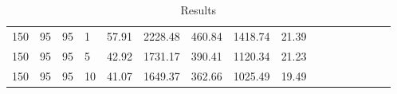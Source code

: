 \begin{center}
\begin{table}[h]
\begin{tabular}{clclclclclclclc|c}
150 & 95 & 95 & 1 & \cellcolor{gray!1}57.91 & \cellcolor{gray!1}2228.48 & \cellcolor{gray!1}460.84 & \cellcolor{gray!1}1418.74 & 21.39\\
150 & 95 & 95 & 5 & \cellcolor{gray!19}42.92 & \cellcolor{gray!1}1731.17 & \cellcolor{gray!1}390.41 & \cellcolor{gray!1}1120.34 & 21.23\\
150 & 95 & 95 & 10 & \cellcolor{gray!38}41.07 & \cellcolor{gray!1}1649.37 & \cellcolor{gray!1}362.66 & \cellcolor{gray!1}1025.49 & 19.49
\end{tabular}
\caption{Results}
\label{tab:res1}
\end{table}
\end{center}